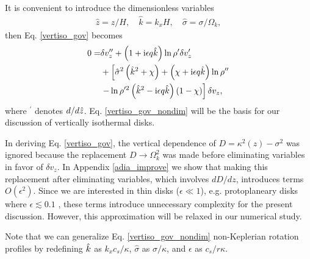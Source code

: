 It is convenient to introduce the dimensionless variables
\begin{align}
  \hat{z} = z/H,\quad \hat{k}=k_xH, \quad \hat{\sigma} = \sigma/\Omega_k,
\end{align}
then Eq. \ref{vertiso_gov} becomes
\begin{align}
  0=& \delta v_z ^{\prime\prime} + \left(1 + \mathrm{i}\epsilon
    q\hat{k}\right)\ln\rho^{\prime}\delta v_z^\prime \notag\\
  &+
  \left[\hat{\sigma}^2\left(\hat{k}^2+\chi\right) +
    \left(  \chi + \mathrm{i} \epsilon q\hat{k}\right)\ln\rho^{\prime\prime}\right.
  \notag\\
  &\left.- \ln\rho^{\prime
      2}\left(\hat{k}^2 -
      \mathrm{i}\epsilon
      q\hat{k}\right)\left(1 - \chi\right)\right]\delta v_z,\label{vertiso_gov_nondim}
\end{align}
where $^\prime$ denotes $d/d\hat{z}$. Eq. \ref{vertiso_gov_nondim} will
be the basis for our discussion of vertically isothermal disks. 

In deriving Eq. \ref{vertiso_gov}, the vertical dependence of
$D=\kappa^2(z)-\sigma^2$ was ignored because the replacement
$D\to\Omega_k^2$ was made before eliminating variables in favor of
$\delta v_z$. In Appendix \ref{adia_improve} we show that making this
replacement after eliminating variables, which involves $dD/dz$,
introduces terms $O(\epsilon^2)$. Since we are interested in 
thin disks ($\epsilon\ll 1 $), e.g. protoplaneary disks where 
$\epsilon\lesssim 0.1$ \citep{chiang10}, these terms introduce
unnecessary complexity for the present discussion. However, this
approximation will be relaxed in our numerical study.  


Note that we can generalize Eq. \ref{vertiso_gov_nondim} non-Keplerian
rotation profiles by redefining $\hat{k}$ as $k_xc_s/\kappa$,
$\hat{\sigma}$ as $\sigma/\kappa$, and  $\epsilon$ as $c_s/r\kappa$.     





      



